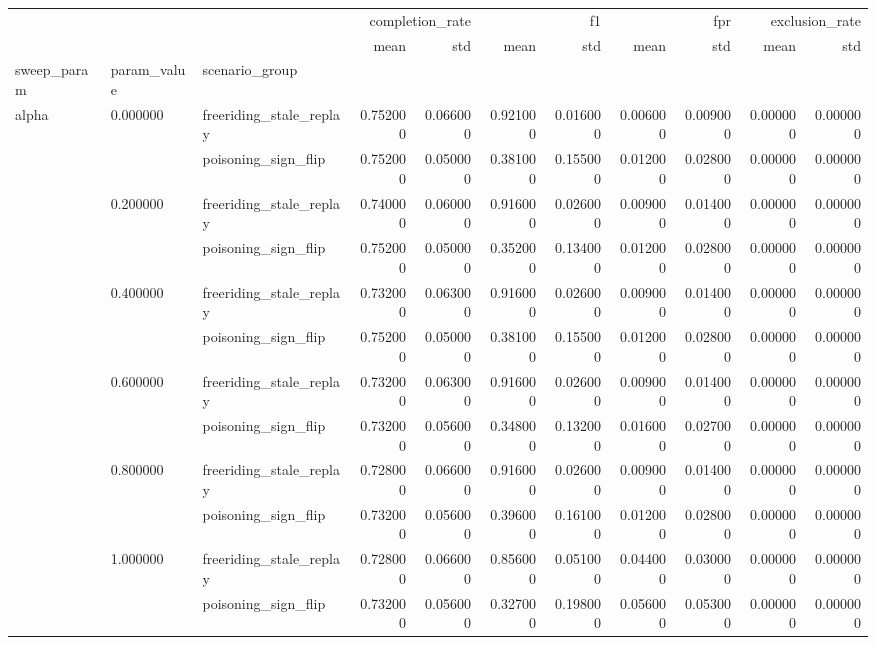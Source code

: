 \begin{tabular}{lllrrrrrrrr}
\toprule
 &  &  & \multicolumn{2}{r}{completion_rate} & \multicolumn{2}{r}{f1} & \multicolumn{2}{r}{fpr} & \multicolumn{2}{r}{exclusion_rate} \\
 &  &  & mean & std & mean & std & mean & std & mean & std \\
sweep_param & param_value & scenario_group &  &  &  &  &  &  &  &  \\
\midrule
\multirow[t]{12}{*}{alpha} & \multirow[t]{2}{*}{0.000000} & freeriding_stale_replay & 0.752000 & 0.066000 & 0.921000 & 0.016000 & 0.006000 & 0.009000 & 0.000000 & 0.000000 \\
 &  & poisoning_sign_flip & 0.752000 & 0.050000 & 0.381000 & 0.155000 & 0.012000 & 0.028000 & 0.000000 & 0.000000 \\
\cline{2-11}
 & \multirow[t]{2}{*}{0.200000} & freeriding_stale_replay & 0.740000 & 0.060000 & 0.916000 & 0.026000 & 0.009000 & 0.014000 & 0.000000 & 0.000000 \\
 &  & poisoning_sign_flip & 0.752000 & 0.050000 & 0.352000 & 0.134000 & 0.012000 & 0.028000 & 0.000000 & 0.000000 \\
\cline{2-11}
 & \multirow[t]{2}{*}{0.400000} & freeriding_stale_replay & 0.732000 & 0.063000 & 0.916000 & 0.026000 & 0.009000 & 0.014000 & 0.000000 & 0.000000 \\
 &  & poisoning_sign_flip & 0.752000 & 0.050000 & 0.381000 & 0.155000 & 0.012000 & 0.028000 & 0.000000 & 0.000000 \\
\cline{2-11}
 & \multirow[t]{2}{*}{0.600000} & freeriding_stale_replay & 0.732000 & 0.063000 & 0.916000 & 0.026000 & 0.009000 & 0.014000 & 0.000000 & 0.000000 \\
 &  & poisoning_sign_flip & 0.732000 & 0.056000 & 0.348000 & 0.132000 & 0.016000 & 0.027000 & 0.000000 & 0.000000 \\
\cline{2-11}
 & \multirow[t]{2}{*}{0.800000} & freeriding_stale_replay & 0.728000 & 0.066000 & 0.916000 & 0.026000 & 0.009000 & 0.014000 & 0.000000 & 0.000000 \\
 &  & poisoning_sign_flip & 0.732000 & 0.056000 & 0.396000 & 0.161000 & 0.012000 & 0.028000 & 0.000000 & 0.000000 \\
\cline{2-11}
 & \multirow[t]{2}{*}{1.000000} & freeriding_stale_replay & 0.728000 & 0.066000 & 0.856000 & 0.051000 & 0.044000 & 0.030000 & 0.000000 & 0.000000 \\
 &  & poisoning_sign_flip & 0.732000 & 0.056000 & 0.327000 & 0.198000 & 0.056000 & 0.053000 & 0.000000 & 0.000000 \\

\end{tabular}
